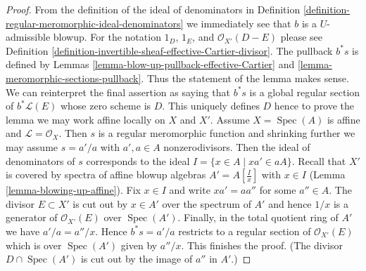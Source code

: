 \documentclass[10pt,a4paper]{amsart}
\theoremstyle{plain}
\theoremstyle{definition}
\theoremstyle{remark}
\numberwithin{equation}{subsection}
\def\Spec{\mathop{\mathrm{Spec}}}
\begin{document}
\begin{proof}
From the definition of the ideal of denominators in
Definition
\ref{definition-regular-meromorphic-ideal-denominators}
we immediately see that $b$ is a $U$-admissible blowup.
For the notation $1_D$, $1_E$, and $\mathcal{O}_{X'}(D - E)$
please see Definition
\ref{definition-invertible-sheaf-effective-Cartier-divisor}.
The pullback $b^*s$ is defined by
Lemmas \ref{lemma-blow-up-pullback-effective-Cartier} and
\ref{lemma-meromorphic-sections-pullback}.
Thus the statement of the lemma makes sense.
We can reinterpret the final assertion as saying
that $b^*s$ is a global regular section of
$b^*\mathcal{L}(E)$ whose zero scheme is $D$.
This uniquely defines $D$ hence
to prove the lemma we may work affine locally on $X$ and $X'$.
Assume $X = \Spec(A)$ is affine and
$\mathcal{L} = \mathcal{O}_X$. Then $s$ is a regular meromorphic
function and shrinking further we may assume
$s = a'/a$ with $a', a \in A$ nonzerodivisors.
Then the ideal of denominators of $s$ corresponds
to the ideal $I = \{x \in A \mid xa' \in aA\}$.
Recall that $X'$ is covered by spectra of affine blowup
algebras $A' = A[\frac{I}{x}]$ with $x \in I$
(Lemma \ref{lemma-blowing-up-affine}). Fix $x \in I$ and
write $xa' = a a''$ for some $a'' \in A$.
The divisor $E \subset X'$ is cut out by $x \in A'$ over
the spectrum of $A'$ and hence $1/x$ is a 
generator of $\mathcal{O}_{X'}(E)$ over $\Spec(A')$.
Finally, in the total quotient ring
of $A'$ we have $a'/a = a''/x$. Hence $b^*s = a'/a$ restricts
to a regular section of $\mathcal{O}_{X'}(E)$ which is
over $\Spec(A')$ given by $a''/x$. This finishes the proof.
(The divisor $D \cap \Spec(A')$ is cut out by the image of
$a''$ in $A'$.)
\end{proof}
\end{document}
